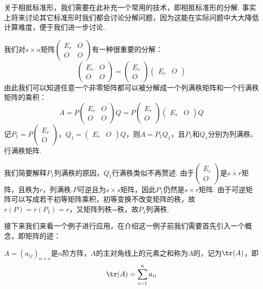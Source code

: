 \begin{solution}

\end{solution}

关于相抵标准形，我们需要在此补充一个常用的技术，即相抵标准形的分解. 事实上将来讨论其它标准形时我们都会讨论分解问题，因为这能在实际问题中大大降低计算难度，便于我们进一步讨论.

我们对$s \times n$矩阵$\begin{pmatrix}
        E_r & O \\ O & O
    \end{pmatrix}$有一种很重要的分解：
\[\begin{pmatrix}
        E_r & O \\ O & O
    \end{pmatrix}=\begin{pmatrix}
        E_r \\ O
    \end{pmatrix}\begin{pmatrix}
        E_r & O
    \end{pmatrix}\]
由此我们可以知道任意一个非零矩阵都可以被分解成一个列满秩矩阵和一个行满秩矩阵的乘积：
\[A=P\begin{pmatrix}
        E_r & O \\ O & O
    \end{pmatrix}Q=P\begin{pmatrix}
        E_r \\ O
    \end{pmatrix}\begin{pmatrix}
        E_r & O
    \end{pmatrix}Q\]
记$P_1=P\begin{pmatrix}
        E_r \\ O
    \end{pmatrix}$，$Q_1=\begin{pmatrix}
        E_r & O
    \end{pmatrix}Q$，则$A=P_1Q_1$，且$P_1$和$Q_1$分别为列满秩、行满秩矩阵.

我们简要解释$P_1$列满秩的原因，$Q_1$行满秩类似不再赘述. 由于$\begin{pmatrix}
        E_r \\ O
    \end{pmatrix}$是$s\times r$矩阵，且秩为$r$，列满秩.$P$可逆且为$s\times s$矩阵，因此$P_1$仍然是$s\times r$矩阵. 由于可逆矩阵可以写成若干初等矩阵乘积，初等变换不改变矩阵的秩，故$r(P)=r(P_1)=r$，又矩阵列秩=秩，故$P_1$列满秩.

接下来我们来看一个例子进行应用，在介绍这一例子前我们需要首先引入一个概念，即矩阵的迹：
\begin{definition}[{\keyterm{迹}[trace]}]
    $A=(a_{ij})_{n\times n}$是$n$阶方阵，$A$的主对角线上的元素之和称为$A$的，记为$\tr(A)$，即
    \[\tr(A)=\sum_{i=1}^n a_{ii}\]
\end{definition}

